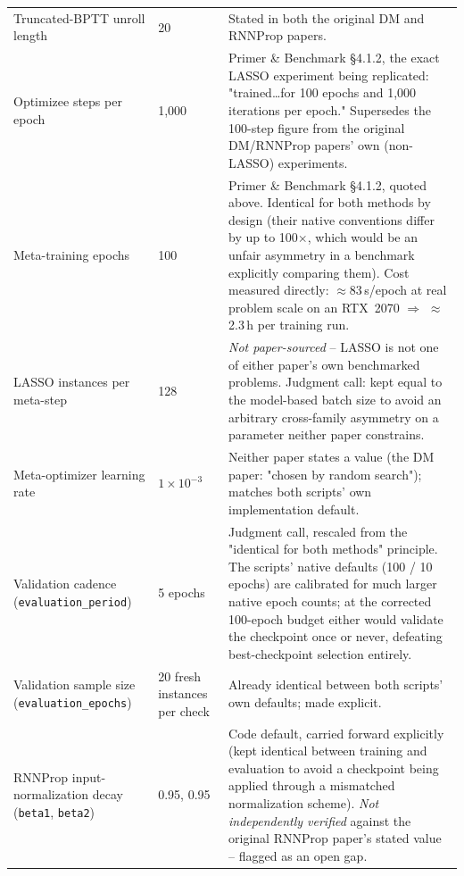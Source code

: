 \begin{longtable}{@{} l l p{7.6cm} @{}}
\addlinespace
\multicolumn{3}{@{}l}{\textbf{Model-free (L2O-DM / L2O-RNNProp) -- training}} \\
\midrule
Truncated-BPTT unroll length & 20 & Stated in both the original DM and RNNProp papers. \\
Optimizee steps per epoch & 1{,}000 & Primer \& Benchmark \S4.1.2, the exact LASSO experiment being replicated: "trained\ldots for 100 epochs and 1,000 iterations per epoch." Supersedes the 100-step figure from the original DM/RNNProp papers' own (non-LASSO) experiments. \\
Meta-training epochs & 100 & Primer \& Benchmark \S4.1.2, quoted above. Identical for both methods by design (their native conventions differ by up to 100$\times$, which would be an unfair asymmetry in a benchmark explicitly comparing them). Cost measured directly: $\approx$83\,s/epoch at real problem scale on an RTX~2070 $\Rightarrow$ $\approx$2.3\,h per training run. \\
LASSO instances per meta-step & 128 & \emph{Not paper-sourced} -- LASSO is not one of either paper's own benchmarked problems. Judgment call: kept equal to the model-based batch size to avoid an arbitrary cross-family asymmetry on a parameter neither paper constrains. \\
Meta-optimizer learning rate & $1\times10^{-3}$ & Neither paper states a value (the DM paper: "chosen by random search"); matches both scripts' own implementation default. \\
Validation cadence (\texttt{evaluation\_period}) & 5 epochs & Judgment call, rescaled from the "identical for both methods" principle. The scripts' native defaults (100 / 10 epochs) are calibrated for much larger native epoch counts; at the corrected 100-epoch budget either would validate the checkpoint once or never, defeating best-checkpoint selection entirely. \\
Validation sample size (\texttt{evaluation\_epochs}) & 20 fresh instances per check & Already identical between both scripts' own defaults; made explicit. \\
RNNProp input-normalization decay (\texttt{beta1}, \texttt{beta2}) & 0.95, 0.95 & Code default, carried forward explicitly (kept identical between training and evaluation to avoid a checkpoint being applied through a mismatched normalization scheme). \emph{Not independently verified} against the original RNNProp paper's stated value -- flagged as an open gap. \\


\end{longtable}
